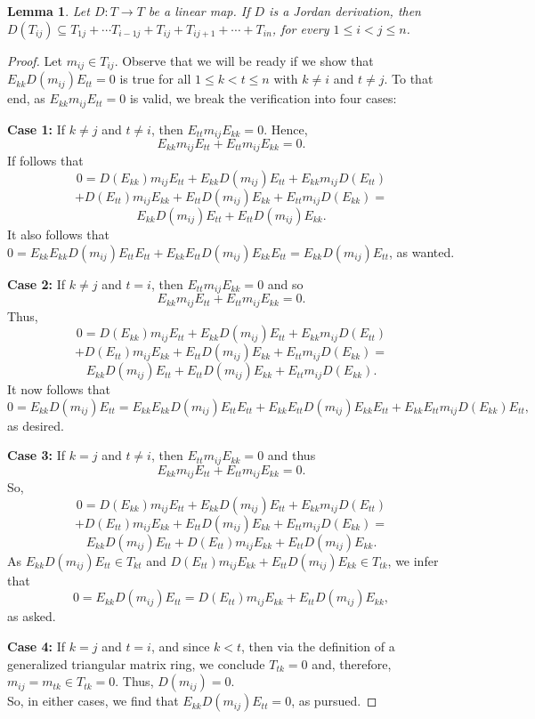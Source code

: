 \documentclass[12pt, reqno]{amsart}
\newtheorem{lemma}[theorem]{Lemma}
\theoremstyle{definition}
\numberwithin{equation}{section}
\begin{document}
\begin{lemma}\label{2} Let $D : T \longrightarrow T$ be a linear map. If $D$ is a Jordan derivation, then
$D(T_{ij})\subseteq T_{1j}+\cdots T_{i-1j}+T_{ij}+T_{ij+1}+\cdots +T_{in}$, for every $1\leq i< j\leq n$.
 \end{lemma}

\begin{proof} Let $m_{ij}\in T_{ij}$. Observe that we will be ready if we show that $E_{kk}D({m_{ij}})E_{tt}=0$ is true for all $1\leq k<t\leq n$ with $k\neq i$ and $t\neq j$. To that end, as $E_{kk}m_{ij}E_{tt}=0$ is valid,
we break the verification into four cases:

\medskip

\noindent\textbf{Case 1:} If $k\neq j$ and $t\neq i$, then $E_{tt}m_{ij}E_{ kk}=0$. Hence, $$E_{kk}m_{ij}E_{tt}+E_{tt}m_{ij}E_{ kk}=0.$$ If follows that $$0=D(E_{kk})m_{ij}E_{tt}+E_{kk}D(m_{ij})E_{tt}+E_{kk}m_{ij}D(E_{tt})$$
$$+D(E_{tt})m_{ij}E_{kk}+E_{tt}D(m_{ij})E_{kk}+E_{tt}m_{ij}D(E_{kk})=$$
$$E_{kk}D(m_{ij})E_{tt}+E_{tt}D(m_{ij})E_{kk}.$$ It also follows that $0=E_{kk}E_{kk}D(m_{ij})E_{tt}E_{tt}+E_{kk}E_{tt}D(m_{ij})E_{kk}E_{tt}=E_{kk}D(m_{ij})E_{tt}$, as wanted.

\medskip

\noindent\textbf{Case 2:} If $k\neq j$ and $t=i$, then $E_{tt}m_{ij}E_{ kk}=0$ and so $$E_{kk}m_{ij}E_{tt}+E_{tt}m_{ij}E_{kk}=0.$$ Thus,
$$0=D(E_{kk})m_{ij}E_{tt}+E_{kk}D(m_{ij})E_{tt}+E_{kk}m_{ij}D(E_{tt})$$
$$+D(E_{tt})m_{ij}E_{kk}+E_{tt}D(m_{ij})E_{kk}+E_{tt}m_{ij}D(E_{kk})=$$
$$E_{kk}D(m_{ij})E_{tt}+E_{tt}D(m_{ij})E_{kk}+E_{tt}m_{ij}D(E_{kk}).$$ It now follows that $$0=E_{kk}D(m_{ij})E_{tt}=E_{kk}E_{kk}D(m_{ij})E_{tt}E_{tt}+E_{kk}E_{tt}D(m_{ij})E_{kk}E_{tt}+E_{kk}E_{tt}m_{ij}D(E_{kk})E_{tt},$$   as desired.

\medskip

\noindent\textbf{Case 3:} If $k= j$ and $t\neq i$, then $E_{tt}m_{ij}E_{ kk}=0$ and thus $$E_{kk}m_{ij}E_{tt}+E_{tt}m_{ij}E_{ kk}=0.$$ So,
$$0=D(E_{kk})m_{ij}E_{tt}+E_{kk}D(m_{ij})E_{tt}+E_{kk}m_{ij}D(E_{tt})$$
$$+D(E_{tt})m_{ij}E_{kk}+E_{tt}D(m_{ij})E_{kk}+E_{tt}m_{ij}D(E_{kk})=$$
$$E_{kk}D(m_{ij})E_{tt}+D(E_{tt})m_{ij}E_{kk}+E_{tt}D(m_{ij})E_{kk}.$$ As $E_{kk}D(m_{ij})E_{tt}\in T_{kt}$ and $D(E_{tt})m_{ij}E_{kk}+E_{tt}D(m_{ij})E_{kk}\in T_{tk}$, we infer that $$0=E_{kk}D(m_{ij})E_{tt}=D(E_{tt})m_{ij}E_{kk}+E_{tt}D(m_{ij})E_{kk},$$ as asked.

\medskip

\noindent\textbf{Case 4:} If $k= j$ and $t= i$, and since $k< t$, then via the definition of a generalized triangular matrix ring, we conclude $T_{tk}=0$ and, therefore, $m_{ij}=m_{tk}\in T_{tk}=0$. Thus, $D (m_{ij})=0$.\\

So, in either cases, we find that $E_{kk}D(m_{ij})E_{tt}=0$, as pursued.
\end{proof}
\end{document}
